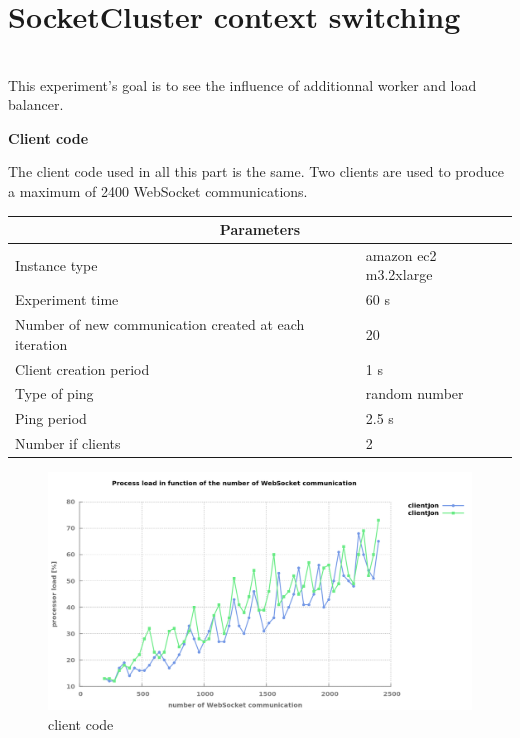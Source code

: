 \section{SocketCluster context switching}
\section{}

This experiment's goal is to see the influence of additionnal worker and load balancer.

\textbf{Client code}

The client code used in all this part is the same. Two clients are used to
produce a maximum of 2400 WebSocket communications.


\begin{center}
  \begin{tabular}{ | l | l |}
  \hline
  \multicolumn{2}{|c|}{Parameters} \\
  \hline
    Instance type &  amazon ec2 m3.2xlarge\\ 
    Experiment time & 60 s \\
    Number of new communication created at each iteration & 20 \\
    Client creation period & 1 s \\
    Type of ping & random number \\ 
    Ping period & 2.5 s \\ 
    Number if clients & 2 \\
  \hline
  \end{tabular}
\end{center}


\begin{figure}[H]
	\centering
		\includegraphics[width=\textwidth]{./Figures/WS_client_rising.png}
	\caption[WS_client_rising]{client code}
	\label{fig:WS_client_rising}
\end{figure}

